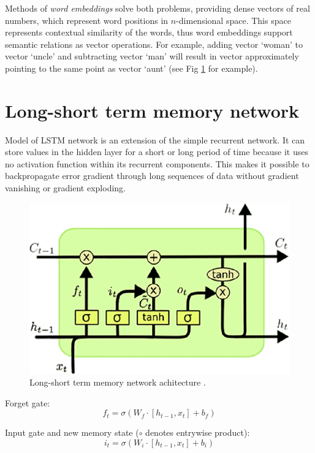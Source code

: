 Methods of \emph{word embeddings} solve both problems, providing dense vectors of real numbers, which represent word positions in $n$-dimensional space. This space represents contextual similarity of the words, thus word embeddings support semantic relations as vector operations. For example, adding vector ‘woman’ to vector ‘uncle’ and subtracting vector ‘man’ will result in vector approximately pointing to the same point as vector ‘aunt’ (see Fig \ref{fig:word_embeddings} for example).

\section{Long-short term memory network}
Model of LSTM network is an extension of the simple recurrent network. It can store values in the hidden layer for a short or long period of time because it uses no activation function within its recurrent components. This makes it possible to backpropagate error gradient through long sequences of data without gradient vanishing or gradient exploding.

\begin{figure}
\centering
\includegraphics{Figures/lstm}
\decoRule
\caption[Long-short term memory]{Long-short term memory network achitecture \parencite{lstm-picture}.}
\label{fig:word_embeddings}
\end{figure}

Forget gate:
\begin{equation}
f_t = \sigma(W_f\cdot[h_{t-1},x_t] + b_f)
\label{lstm:ft}
\end{equation} 

Input gate and new memory state ($\circ$ denotes entrywise product):
\begin{equation}

i_t=\sigma(W_i\cdot[h_{t-1}, x_t]+b_i)
\label{lstm:input}
\end{equation} 

